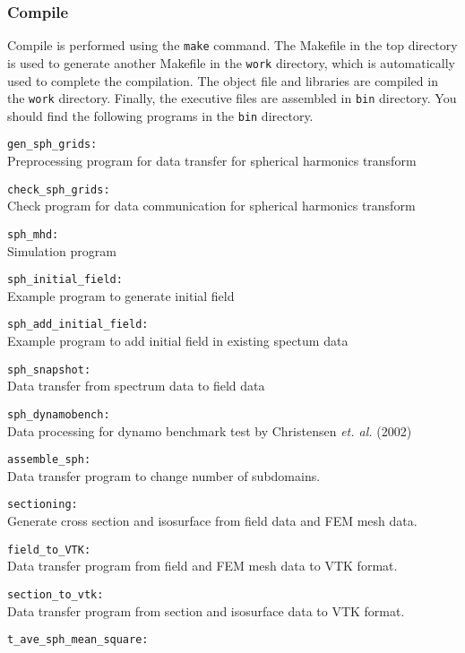 \subsubsection{Compile}
Compile is performed using the {\tt make} command. The Makefile in the top directory is used to generate another Makefile in the {\tt work} directory, which is automatically used to complete the compilation. The object file and libraries are compiled in the {\tt work} directory. Finally, the executive files are assembled in {\tt bin} directory. You should find the following programs in the {\tt bin} directory.
%
\begin{description}
\item{\tt gen\_sph\_grids:    }\\
 Preprocessing program for data transfer for spherical harmonics transform
\item{\tt check\_sph\_grids:    }\\
 Check program for data communication for spherical harmonics transform
\item{\tt sph\_mhd:          }\\
 Simulation program
\item{\tt sph\_initial\_field: }\\
 Example program to generate initial field
\item{\tt sph\_add\_initial\_field: }\\
 Example program to add initial field in existing spectum data
\item{\tt sph\_snapshot:     }\\
 Data transfer from spectrum data to field data
\item{\tt sph\_dynamobench:  }\\
 Data processing for dynamo benchmark test by Christensen {\it et. al.} (2002)
\item{\tt assemble\_sph:     }\\
 Data transfer program to change number of subdomains.
\item{\tt sectioning:     }\\
 Generate cross section and isosurface from field data and FEM mesh data.
\item{\tt field\_to\_VTK:   }\\
 Data transfer program from field and FEM mesh data to VTK format.
\item{\tt section\_to\_vtk:     }\\
 Data transfer program from section and isosurface data to VTK format.
\item{\tt t\_ave\_sph\_mean\_square:     }\\

\end{description}

